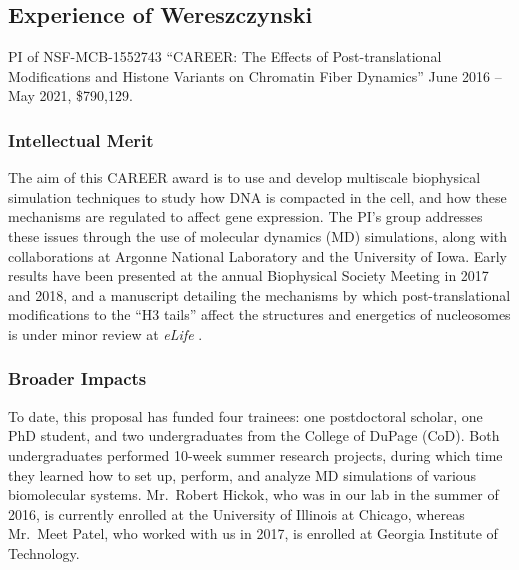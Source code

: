 \documentclass[11pt]{NSFamsart}
\begin{document}
\subsection{Experience of Wereszczynski}


PI of NSF-MCB-1552743   ``CAREER: The Effects of Post-translational Modifications and Histone Variants on Chromatin Fiber Dynamics'' June 2016 -- May 2021, \$790,129.

\subsubsection{Intellectual Merit} The aim of this CAREER award is to use and develop multiscale biophysical simulation techniques to study how DNA is compacted in the cell, and how these mechanisms are regulated to affect gene expression.  The PI's group addresses these issues through the use of molecular dynamics (MD) simulations, along with collaborations at Argonne National Laboratory and the University of Iowa.  Early results have been presented at the annual Biophysical Society Meeting in 2017 and 2018, and a manuscript detailing the mechanisms by which post-translational modifications to the ``H3 tails'' affect the structures and energetics of nucleosomes is under minor review at \textit{eLife} \cite{MorrisonBSW18}.

\subsubsection{Broader Impacts} To date, this proposal has funded four trainees: one postdoctoral scholar, one PhD student, and two undergraduates from the College of DuPage (CoD).  Both undergraduates performed 10-week summer research projects, during which time they learned how to set up, perform, and analyze MD simulations of various biomolecular systems. Mr.~Robert Hickok, who was in our lab in the summer of 2016, is currently enrolled at the University of Illinois at Chicago, whereas Mr.~Meet Patel, who worked with us in 2017, is enrolled at Georgia Institute of Technology.  


\end{document}
